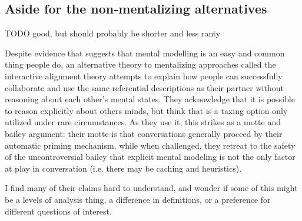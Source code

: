 \documentclass[]{article}
\begin{document}



\subsection{Aside for the non-mentalizing alternatives} 

TODO good, but should probably be shorter and less ranty

Despite evidence that suggests that mental modelling is an easy and common thing people do, an alternative theory to mentalizing approaches called the interactive alignment theory attempts to explain how people can successfully collaborate and use the same referential descriptions as their partner without reasoning about each other's mental states. They acknowledge that it is possible to reason explicitly about others minds, but think that is a taxing option only utilized under rare circumstances. As they use it, this strikes as a motte and bailey argument: their motte is that conversations generally proceed by their automatic priming mechanism, while when challenged, they retreat to the safety of the uncontroversial bailey that explicit mental modeling is not the only factor at play in conversation (i.e. there may be caching and heuristics).  


I find many of their claims hard to understand, and wonder if some of this might be a levels of analysis thing, a difference in definitions, or a preference for different questions of interest. 
\end{document}
